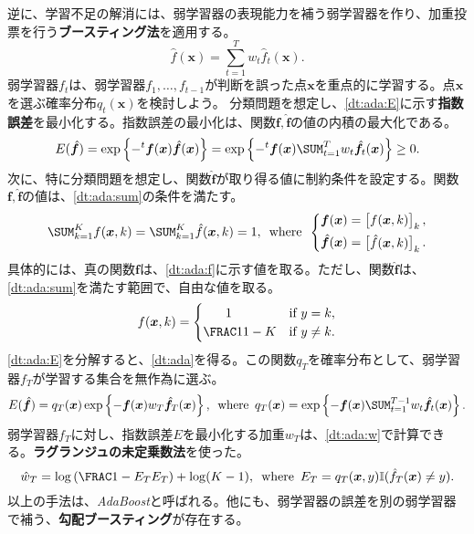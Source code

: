 \documentclass[10pt,a4paper]{book}
\begin{document}
逆に、学習不足の解消には、弱学習器の表現能力を補う弱学習器を作り、加重投票を行う\textbf{ブースティング法}を適用する。
%
\begin{equation}
\hat{f}(\bm{x}) = \sum_{t=1}^T w_t \hat{f}_t(\bm{x}).
\end{equation}
%
弱学習器$f_t$は、弱学習器$f_1,\ldots,f_{t-1}$が判断を誤った点$\bm{x}$を重点的に学習する。点$\bm{x}$を選ぶ確率分布$q_t(\bm{x})$を検討しよう。
分類問題を想定し、\eqref{dt:ada:E}に示す\textbf{指数誤差}を最小化する。指数誤差の最小化は、関数$\bm{f},\hat{\bm{f}}$の値の内積の最大化である。
%
\begin{equation}
\label{eq:dt:ada:E}
E(\hat{\bm{f}}) =
\exp \seq{-\trans{\bm{f}(\bm{x})} \hat{\bm{f}}(\bm{x})} =
\exp \seq{-\trans{\bm{f}(\bm{x})} \sum_{t=1}^T w_t \hat{\bm{f}}_t(\bm{x})} \geq 0.
\end{equation}
%
次に、特に分類問題を想定し、関数$\hat{\bm{f}}$が取り得る値に制約条件を設定する。関数$\bm{f},\hat{\bm{f}}$の値は、\eqref{dt:ada:sum}の条件を満たす。
%
\begin{equation}
\label{eq:dt:ada:sum}
\sum_{k=1}^K f(\bm{x},k) =
\sum_{k=1}^K \hat{f}(\bm{x},k) = 1,
\where
\left\{
\begin{aligned}
\bm{f}(\bm{x}) =
\begin{bmatrix}
f(\bm{x},k)
\end{bmatrix}_k,\\
\hat{\bm{f}}(\bm{x}) =
\begin{bmatrix}
\hat{f}(\bm{x},k)
\end{bmatrix}_k.
\end{aligned}
\right.
\end{equation}
%
具体的には、真の関数$\bm{f}$は、\eqref{dt:ada:f}に示す値を取る。ただし、関数$\hat{\bm{f}}$は、\eqref{dt:ada:sum}を満たす範囲で、自由な値を取る。
%
\begin{equation}
\label{eq:dt:ada:f}
f(\bm{x},k) =
\begin{cases}
\hfil1\hfil& \text{if $y=k$},\\
\frac{1}{1-K}& \text{if $y\neq k$}.
\end{cases}
\end{equation}
%
\eqref{dt:ada:E}を分解すると、\eqref{dt:ada}を得る。この関数$q_T$を確率分布として、弱学習器$f_T$が学習する集合を無作為に選ぶ。
%
\begin{equation}
\label{eq:dt:ada}
E(\hat{\bm{f}}) =
q_T(\bm{x}) \exp \seq{-\bm{f}(\bm{x}) w_T \hat{\bm{f}}_T(\bm{x})},
\where
q_T(\bm{x}) =
\exp \seq{-\bm{f}(\bm{x}) \sum_{t=1}^{T-1} w_t \hat{\bm{f}}_t(\bm{x})}.
\end{equation}
%
弱学習器$f_T$に対し、指数誤差$E$を最小化する加重$w_T$は、\eqref{dt:ada:w}で計算できる。\textbf{ラグランジュの未定乗数法}を使った。
%
\begin{equation}
\label{eq:dt:ada:w}
\hat{w}_T = \log \tup{\frac{1-E_T}{E_T}} + \log (K-1),
\where
E_T = q_T(\bm{x},y) \mathbb{I}(\hat{f}_T(\bm{x}) \neq y).
\end{equation}
%
以上の手法は、\textit{AdaBoost}と呼ばれる。他にも、弱学習器の誤差を別の弱学習器で補う、\textbf{勾配ブースティング}が存在する。
\end{document}
